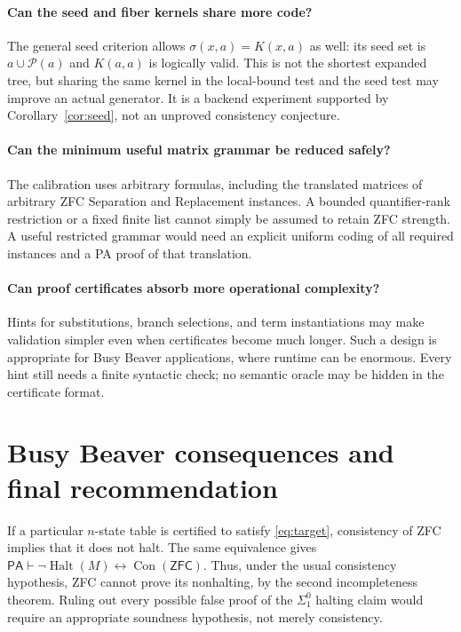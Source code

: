 \documentclass[11pt,letterpaper]{article}
\theoremstyle{definition}\newtheorem{definition}[theorem]{Definition}
\theoremstyle{remark}\newtheorem{remark}[theorem]{Remark}
\newcommand{\PA}{\mathsf{PA}}
\newcommand{\ZFC}{\mathsf{ZFC}}
\newcommand{\Pow}{\mathcal{P}}
\newcommand{\Con}{\operatorname{Con}}
\newcommand{\Halt}{\operatorname{Halt}}
\begin{document}
\paragraph{Can the seed and fiber kernels share more code?}
The general seed criterion allows $\sigma(x,a)=K(x,a)$ as well:
its seed set is $a\cup\Pow(a)$ and $K(a,a)$ is logically valid.
This is not the shortest expanded tree, but sharing the same kernel in
the local-bound test and the seed test may improve an actual generator.
It is a backend experiment supported by Corollary~\ref{cor:seed}, not
an unproved consistency conjecture.

\paragraph{Can the minimum useful matrix grammar be reduced safely?}
The calibration uses arbitrary formulas, including the translated
matrices of arbitrary ZFC Separation and Replacement instances. A bounded
quantifier-rank restriction or a fixed finite list cannot simply be
assumed to retain ZFC strength. A useful restricted grammar would need
an explicit uniform coding of all required instances and a PA proof of
that translation.

\paragraph{Can proof certificates absorb more operational complexity?}
Hints for substitutions, branch selections, and term instantiations may
make validation simpler even when certificates become much longer.
Such a design is appropriate for Busy Beaver applications, where
runtime can be enormous. Every hint still needs a finite syntactic
check; no semantic oracle may be hidden in the certificate format.

\section{Busy Beaver consequences and final recommendation}

If a particular $n$-state table is certified to satisfy
\eqref{eq:target}, consistency of ZFC implies that it does not halt.
The same equivalence gives
$\PA\vdash\neg\Halt(M)\leftrightarrow\Con(\ZFC)$.
Thus, under the usual consistency hypothesis, ZFC cannot prove its
nonhalting, by the second incompleteness theorem. Ruling out every
possible false proof of the $\Sigma^0_1$ halting claim would require an
appropriate soundness hypothesis, not merely consistency.
\end{document}
